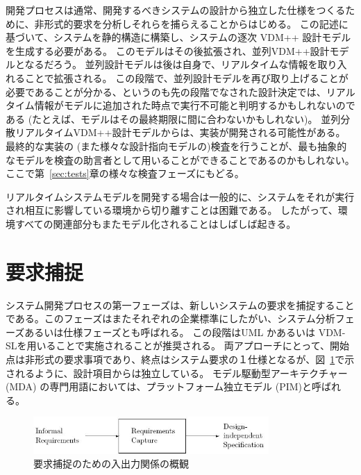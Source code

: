 \documentclass[\pformat,12pt]{jreport}
\begin{document}
開発プロセスは通常、開発するべきシステムの設計から独立した仕様をつくるために、非形式的要求を分析しそれらを捕らえることからはじめる。
この記述に基づいて、システムを静的構造に構築し、システムの逐次 VDM++ 設計モデルを生成する必要がある。
このモデルはその後拡張され、並列VDM++設計モデルとなるだろう。
並列設計モデルは後は自身で、リアルタイムな情報を取り入れることで拡張される。
この段階で、並列設計モデルを再び取り上げることが必要であることが分かる、というのも先の段階でなされた設計決定では、リアルタイム情報がモデルに追加された時点で実行不可能と判明するかもしれないのである (たとえば、モデルはその最終期限に間に合わないかもしれない)。 
並列分散リアルタイムVDM++設計モデルからは、実装が開発される可能性がある。  
最終的な実装の (また様々な設計指向モデルの)検査を行うことが、最も抽象的なモデルを検査の助言者として用いることができることであるのかもしれない。
ここで第~\ref{sec:tests}章の様々な検査フェーズにもどる。

リアルタイムシステムモデルを開発する場合は一般的に、システムをそれが実行され相互に影響している環境から切り離すことは困難である。
したがって、環境すべての関連部分もまたモデル化されることはしばしば起きる。

\section{要求捕捉}

システム開発プロセスの第一フェーズは、新しいシステムの要求を捕捉することである。このフェーズはまたそれぞれの企業標準にしたがい、システム分析フェーズあるいは仕様フェーズとも呼ばれる。
この段階はUML かあるいは VDM-SLを用いることで実施されることが推奨される。
両アプローチにとって、開始点は非形式の要求事項であり、終点はシステム要求の１仕様となるが、図~\ref{fig:inputoutput}で示されるように、設計項目からは独立している。
モデル駆動型アーキテクチャー(MDA) \cite{MDA} の専門用語においては、プラットフォーム独立モデル (PIM)と呼ばれる。

\begin{figure}
\begin{center}
\includegraphics[width=0.8\textwidth]{reqcapture}
\end{center}
\caption{要求捕捉のための入出力関係の概観}\label{fig:inputoutput}
\end{figure}
\end{document}
